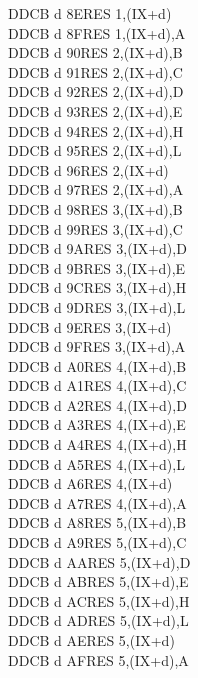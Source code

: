 \begin{multicols}{3}
{\begin{tabbing}
    DDCB d 8E\>RES 1,(IX+d)\\
    DDCB d 8F\>RES 1,(IX+d),A\UNDOC\\
    DDCB d 90\>RES 2,(IX+d),B\UNDOC\\
    DDCB d 91\>RES 2,(IX+d),C\UNDOC\\
    DDCB d 92\>RES 2,(IX+d),D\UNDOC\\
    DDCB d 93\>RES 2,(IX+d),E\UNDOC\\
    DDCB d 94\>RES 2,(IX+d),H\UNDOC\\
    DDCB d 95\>RES 2,(IX+d),L\UNDOC\\
    DDCB d 96\>RES 2,(IX+d)\\
    DDCB d 97\>RES 2,(IX+d),A\UNDOC\\
    DDCB d 98\>RES 3,(IX+d),B\UNDOC\\
    DDCB d 99\>RES 3,(IX+d),C\UNDOC\\
    DDCB d 9A\>RES 3,(IX+d),D\UNDOC\\
    DDCB d 9B\>RES 3,(IX+d),E\UNDOC\\
    DDCB d 9C\>RES 3,(IX+d),H\UNDOC\\
    DDCB d 9D\>RES 3,(IX+d),L\UNDOC\\
    DDCB d 9E\>RES 3,(IX+d)\\
    DDCB d 9F\>RES 3,(IX+d),A\UNDOC\\
    DDCB d A0\>RES 4,(IX+d),B\UNDOC\\
    DDCB d A1\>RES 4,(IX+d),C\UNDOC\\
    DDCB d A2\>RES 4,(IX+d),D\UNDOC\\
    DDCB d A3\>RES 4,(IX+d),E\UNDOC\\
    DDCB d A4\>RES 4,(IX+d),H\UNDOC\\
    DDCB d A5\>RES 4,(IX+d),L\UNDOC\\
    DDCB d A6\>RES 4,(IX+d)\\
    DDCB d A7\>RES 4,(IX+d),A\UNDOC\\
    DDCB d A8\>RES 5,(IX+d),B\UNDOC\\
    DDCB d A9\>RES 5,(IX+d),C\UNDOC\\
    DDCB d AA\>RES 5,(IX+d),D\UNDOC\\
    DDCB d AB\>RES 5,(IX+d),E\UNDOC\\
    DDCB d AC\>RES 5,(IX+d),H\UNDOC\\
    DDCB d AD\>RES 5,(IX+d),L\UNDOC\\
    DDCB d AE\>RES 5,(IX+d)\\
    DDCB d AF\>RES 5,(IX+d),A\UNDOC\\

\end{tabbing}}
\end{multicols}
